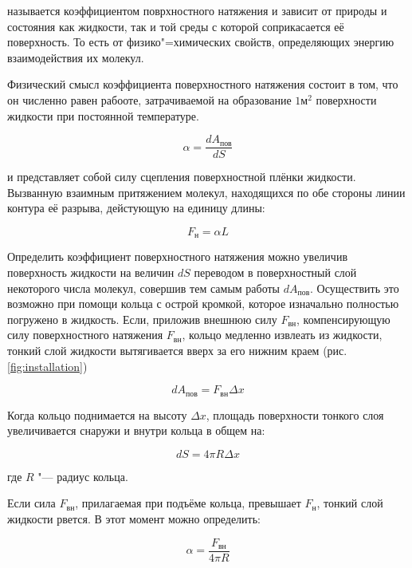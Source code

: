 называется коэффициентом поврхностного натяжения и зависит от природы и состояния как жидкости, так и той среды с которой соприкасается её поверхность. То есть от физико"=химических свойств, определяющих энергию взаимодействия их молекул.

Физический смысл коэффициента поверхностного натяжения состоит в том, что он численно равен рабооте, затрачиваемой на образование $1 \text{м}^2$ поверхности жидкости при постоянной температуре.

\begin{equation*}
    \alpha = \frac{d A_\text{пов}}{d S}
\end{equation*}

и представляет собой силу сцепления поверхностной плёнки жидкости. Вызванную взаимным притяжением молекул, находящихся по обе стороны линии контура её разрыва, дейстующую на единицу длины:

\begin{equation*}
    F_\text{н} = \alpha L
\end{equation*}

Определить коэффициент поверхностного натяжения можно увеличив поверхность жидкости на величин $d S$ переводом в поверхностный слой некоторого числа молекул, совершив тем самым работы $d A_\text{пов}$. Осуществить это возможно при помощи кольца с острой кромкой, которое изначально полностью погружено в жидкость. Если, приложив внешнюю силу $F_\text{вн}$, компенсирующую силу поверхностного натяжения $F_\text{вн}$, кольцо медленно извлеать из жидкости, тонкий слой жидкости вытягивается вверх за его нижним краем (рис. \ref{fig:installation})

\begin{equation*}
    d A_\text{пов} = F_\text{вн} \Delta x
\end{equation*}

Когда кольцо поднимается на высоту $\Delta x$, площадь поверхности тонкого слоя увеличивается снаружи и внутри кольца в общем на:

\begin{equation*}
    d S = 4 \pi R \Delta x
\end{equation*}

где $R$ "--- радиус кольца. 

Если сила $F_\text{вн}$, прилагаемая при подъёме кольца, превышает $F_\text{н}$, тонкий слой жидкости рвется. В этот момент можно определить:

\begin{equation}
    \alpha = \frac{F_\text{вн}}{4 \pi R}
    \label{eq : alpha}
\end{equation}

